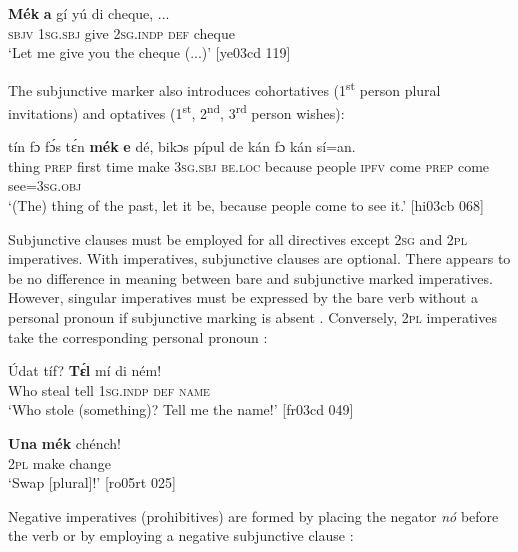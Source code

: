 \ea%
    \label{ex:key:429}
    \gll \textbf{Mék}    \textbf{a} gí    yú    di  cheque, \op...\cp{}\\
\textsc{sbjv}    \textsc{1sg.sbj}  give    \textsc{2sg.indp}  \textsc{def}  cheque\\

\glt ‘Let me give you the cheque (...)’ [ye03cd 119]
\z

The subjunctive marker also introduces cohortatives (1\textsuperscript{st} person plural invitations)  and optatives (1\textsuperscript{st}, 2\textsuperscript{nd}, 3\textsuperscript{rd} person wishes):


\ea%
    \label{ex:key:430}
    \gll tín    fɔ  fɔ́s  tɛ́n    \textbf{mék}    \textbf{e}    dé,    bikɔs  pípul
de    kán    fɔ  kán    sí=an.\\
thing  \textsc{prep}  first time  make  \textsc{3sg.sbj}  \textsc{be.loc}  because  people
\textsc{ipfv}    come  \textsc{prep}  come  see=\textsc{3sg.obj}\\

\glt ‘(The) thing of the past, let it be, because people come to see it.’ [hi03cb 068]
\z

Subjunctive clauses must be employed for all directives except \textsc{2sg} and \textsc{2pl} imperatives. With imperatives, subjunctive clauses are optional. There appears to be no difference in meaning between bare and subjunctive marked imperatives. However, singular imperatives must be expressed by the bare verb without a personal pronoun if subjunctive marking is absent . Conversely, \textsc{2pl} imperatives take the corresponding personal pronoun :


\ea%
    \label{ex:key:431}
    \gll \'{U}dat  tíf?    \textbf{Tɛ́l}  mí    di  ném!\\
Who  steal  tell  \textsc{1sg.indp}  \textsc{def}  \textsc{name}\\

\glt ‘Who stole (something)? Tell me the name!’ [fr03cd 049]
\z


\ea%
    \label{ex:key:432}
    \gll \textbf{Una}    \textbf{mék}    chénch!\\
\textsc{2pl}    make  change\\

\glt ‘Swap [plural]!’ [ro05rt 025]
\z

Negative imperatives (prohibitives) are formed by placing the negator \textit{nó} before the verb  or by employing a negative subjunctive clause : 



